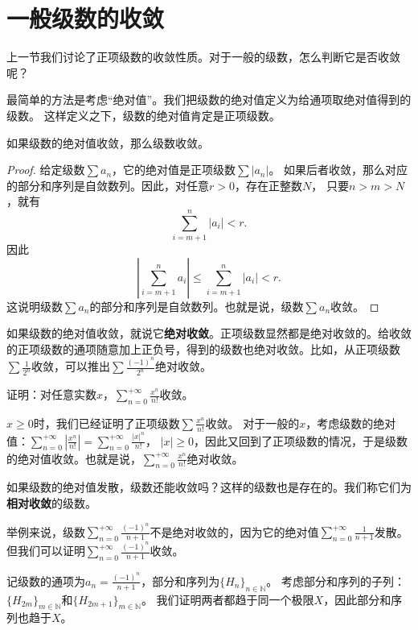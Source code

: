 \documentclass[12pt,UTF8,fontset=none]{ctexbook}
\begin{document}
\section{一般级数的收敛}
上一节我们讨论了正项级数的收敛性质。对于一般的级数，怎么判断它是否收敛呢？

最简单的方法是考虑“绝对值”。我们把级数的绝对值定义为给通项取绝对值得到的级数。
这样定义之下，级数的绝对值肯定是正项级数。

\begin{tm}
    如果级数的绝对值收敛，那么级数收敛。
\end{tm}

\begin{proof}
    给定级数$\sum a_n$，它的绝对值是正项级数$\sum |a_n|$。
    如果后者收敛，那么对应的部分和序列是自敛数列。因此，对任意$r>0$，存在正整数$N$，
    只要$n>m>N$，就有
    $$ \sum_{i=m+1}^n |a_i| < r. $$
    因此
    $$ \left|\sum_{i=m+1}^n a_i \right| \leqslant \sum_{i=m+1}^n |a_i| < r. $$
    这说明级数$\sum a_n$的部分和序列是自敛数列。也就是说，级数$\sum a_n$收敛。
\end{proof}

如果级数的绝对值收敛，就说它\textbf{绝对收敛}。正项级数显然都是绝对收敛的。给收敛的正项级数的通项随意加上正负号，得到的级数也绝对收敛。比如，从正项级数$\sum \frac{1}{2^n}$收敛，可以推出$\sum \frac{(-1)^{n}}{2^n}$绝对收敛。

\begin{et}
    证明：对任意实数$x$，$\sum_{n=0}^{+\infty}\frac{x^{n}}{n!}$收敛。
\end{et}
\begin{so}
    $x\geqslant 0$时，我们已经证明了正项级数$\sum \frac{x^{n}}{n!}$收敛。
    对于一般的$x$，考虑级数的绝对值：$\sum_{n=0}^{+\infty}\left|\frac{x^{n}}{n!}\right| = \sum_{n=0}^{+\infty}\frac{|x|^{n}}{n!}$，
    $|x|\geqslant 0$，因此又回到了正项级数的情况，于是级数的绝对值收敛。也就是说，$\sum_{n=0}^{+\infty}\frac{x^{n}}{n!}$绝对收敛。
\end{so}

如果级数的绝对值发散，级数还能收敛吗？这样的级数也是存在的。我们称它们为\textbf{相对收敛}的级数。

举例来说，级数$\sum_{n=0}^{+\infty} \frac{(-1)^{n}}{n+1}$不是绝对收敛的，因为它的绝对值$\sum_{n=0}^{+\infty} \frac{1}{n+1}$发散。但我们可以证明$\sum_{n=0}^{+\infty} \frac{(-1)^{n}}{n+1}$收敛。

记级数的通项为$a_n = \frac{(-1)^{n}}{n+1}$，部分和序列为$\{H_{n}\}_{n\in\mathbb{N}}$。
考虑部分和序列的子列：$\{H_{2m}\}_{m\in\mathbb{N}}$和$\{H_{2m+1}\}_{m\in\mathbb{N}}$。
我们证明两者都趋于同一个极限$X$，因此部分和序列也趋于$X$。
\end{document}
